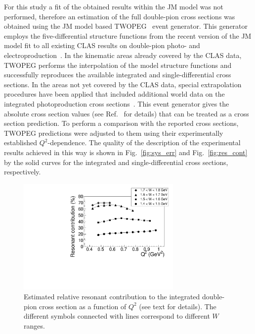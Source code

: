 \documentclass[prc,twocolumn,superscriptaddress,showpacs,amssymb,amsmath,amsfonts,aps,nofootinbib]{revtex4-1}
\begin{document}
For this study a fit of the obtained results within the JM model was not performed, therefore an estimation of the full double-pion cross sections was obtained using the JM model based TWOPEG~\cite{Skorodum:EG} event generator.
This generator employs the five-differential structure functions from the recent version of the JM model fit to all existing CLAS results on double-pion photo- and electroproduction~\cite{Ripani:2002ss,Mokeev:2012vsa,Fedotov:2008aa,Golovach:note}. 
In the kinematic areas already covered by the CLAS data, TWOPEG performs the interpolation of the model structure functions and successfully reproduces the available integrated and single-differential cross sections. 
In the areas not yet covered by the CLAS data, special
extrapolation procedures have been applied that included additional world data on the integrated photoproduction cross sections~\cite{Wu:2005wf,ABBHHM:1968aa}. This event generator gives the absolute cross section values (see Ref.~\cite{Skorodum:EG} for details) that can be treated as a cross section prediction.
To perform a comparison with the reported cross sections, TWOPEG predictions  were adjusted to them using their experimentally established $Q^{2}$-dependence.
The quality of the description of the experimental results achieved in this way is shown in  Fig.~\ref{fig:sys_err} and Fig.~\ref{fig:res_cont} by the solid curves for the integrated and single-differential cross sections, respectively.

\begin{figure}[htp!]
\begin{center}
\includegraphics[width=8cm]{pictures/sys_err/res_cont.pdf}
\caption{\small Estimated relative resonant contribution to the integrated double-pion cross section  as a function of $Q^{2}$ (see text for details).  The different symbols connected with lines correspond to different $W$ ranges.} \label{fig:res_cont_w}
\end{center}
\end{figure}
\end{document}
